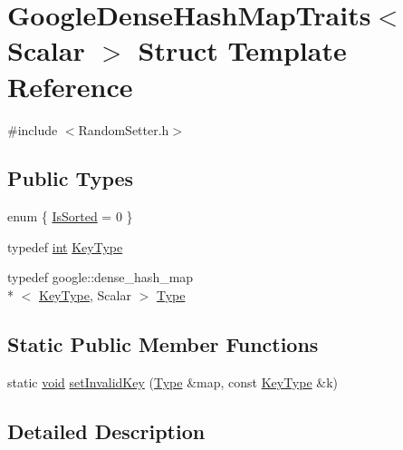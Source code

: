 \hypertarget{struct_google_dense_hash_map_traits}{\section{Google\-Dense\-Hash\-Map\-Traits$<$ Scalar $>$ Struct Template Reference}
\label{struct_google_dense_hash_map_traits}
}


{\ttfamily \#include $<$Random\-Setter.\-h$>$}

\subsection*{Public Types}
\begin{DoxyCompactItemize}
\item 
enum \{ \hyperlink{struct_google_dense_hash_map_traits_a790535e65e69ee736f353ebf460bed94a73b8ceb3f72b35ca41d5b97a342c9ef8}{Is\-Sorted} = 0
 \}
\item 
typedef \hyperlink{ioapi_8h_a787fa3cf048117ba7123753c1e74fcd6}{int} \hyperlink{struct_google_dense_hash_map_traits_af27ef0d23e54f8475888ca7c20b22304}{Key\-Type}
\item 
typedef google\-::dense\-\_\-hash\-\_\-map\\*
$<$ \hyperlink{struct_google_dense_hash_map_traits_af27ef0d23e54f8475888ca7c20b22304}{Key\-Type}, Scalar $>$ \hyperlink{struct_google_dense_hash_map_traits_a52470c39e5d6694d7f05db539a14ce7c}{Type}
\end{DoxyCompactItemize}
\subsection*{Static Public Member Functions}
\begin{DoxyCompactItemize}
\item 
static \hyperlink{group___u_a_v_objects_plugin_ga444cf2ff3f0ecbe028adce838d373f5c}{void} \hyperlink{struct_google_dense_hash_map_traits_ac3fc3a98413df7dae44ed128f003e025}{set\-Invalid\-Key} (\hyperlink{struct_google_dense_hash_map_traits_a52470c39e5d6694d7f05db539a14ce7c}{Type} \&map, const \hyperlink{struct_google_dense_hash_map_traits_af27ef0d23e54f8475888ca7c20b22304}{Key\-Type} \&k)
\end{DoxyCompactItemize}


\subsection{Detailed Description}
